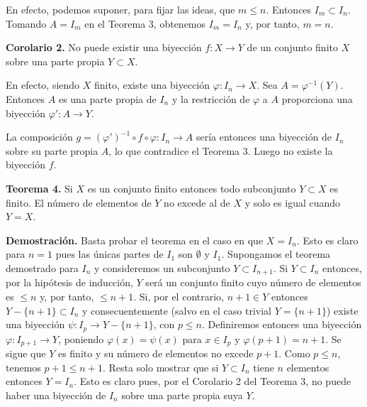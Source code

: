 \documentclass[12pt,oneside]{book}
\begin{document}
En efecto, podemos suponer, para fijar las ideas, que \(m \le n\). Entonces \(I_m \subset I_n\). Tomando \(A = I_m\) en el Teorema 3, obtenemos \(I_m = I_n\) y, por tanto, \(m = n\).

\textbf{Corolario 2.} No puede existir una biyección \( f: X \to Y \) de un conjunto finito \( X \) sobre una parte propia \( Y \subset X \).

En efecto, siendo \( X \) finito, existe una biyección \( \varphi: I_n \to X \). Sea \( A = \varphi^{-1}(Y) \). Entonces \( A \) es una parte propia de \( I_n \) y la restricción de \( \varphi \) a \( A \) proporciona una biyección \( \varphi': A \to Y \).

\begin{center}
\end{center}

La composición \( g = (\varphi')^{-1} \circ f \circ \varphi: I_n \to A \) sería entonces una biyección de \( I_n \) sobre su parte propia \( A \), lo que contradice el Teorema 3. Luego no existe la biyección \( f \).

\textbf{Teorema 4.} Si \( X \) es un conjunto finito entonces todo subconjunto \( Y \subset X \) es finito. El número de elementos de \( Y \) no excede al de \( X \) y solo es igual cuando \( Y = X \).

\textbf{Demostración.} Basta probar el teorema en el caso en que \( X = I_n \). Esto es claro para \( n = 1 \) pues las únicas partes de \( I_1 \) son \( \emptyset \) y \( I_1 \). Supongamos el teorema demostrado para \( I_n \) y consideremos un subconjunto \( Y \subset I_{n+1} \). Si \( Y \subset I_n \) entonces, por la hipótesis de inducción, \( Y \) será un conjunto finito cuyo número de elementos es \( \leq n \) y, por tanto, \( \leq n + 1 \). Si, por el contrario, \( n + 1 \in Y \) entonces \( Y - \{n + 1\} \subset I_n \) y consecuentemente (salvo en el caso trivial \( Y = \{n + 1\} \)) existe una biyección \( \psi: I_p \to Y - \{n + 1\} \), con \( p \leq n \). Definiremos entonces una biyección \( \varphi: I_{p+1} \to Y \), poniendo \( \varphi(x) = \psi(x) \) para \( x \in I_p \) y \( \varphi(p + 1) = n + 1 \). Se sigue que \( Y \) es finito y su número de elementos no excede \( p + 1 \). Como \( p \leq n \), tenemos \( p + 1 \leq n + 1 \). Resta solo mostrar que si \( Y \subset I_n \) tiene \( n \) elementos entonces \( Y = I_n \). Esto es claro pues, por el Corolario 2 del Teorema 3, no puede haber una biyección de \( I_n \) sobre una parte propia suya \( Y \).
\end{document}
